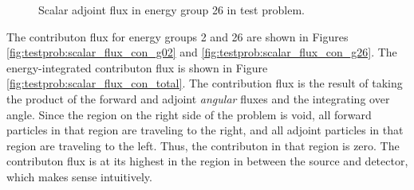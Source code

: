 \begin{figure}
\begin{minipage}{0.49\linewidth}
    \caption{Scalar adjoint flux in energy group 26 in test problem.}
    \label{fig:testprob:scalar_flux_adj_g26}
  \end{minipage}
\end{figure}

The contributon flux for energy groups 2 and 26 are shown in Figures \ref{fig:testprob:scalar_flux_con_g02} and \ref{fig:testprob:scalar_flux_con_g26}.
The energy-integrated contributon flux is shown in Figure \ref{fig:testprob:scalar_flux_con_total}.
The contribution flux is the result of taking the product of the forward and adjoint \textit{angular} fluxes and the integrating over angle.
Since the region on the right side of the problem is void, all forward particles in that region are traveling to the right, and all adjoint particles in that region are traveling to the left.
Thus, the contributon in that region is zero.
The contributon flux is at its highest in the region in between the source and detector, which makes sense intuitively.

